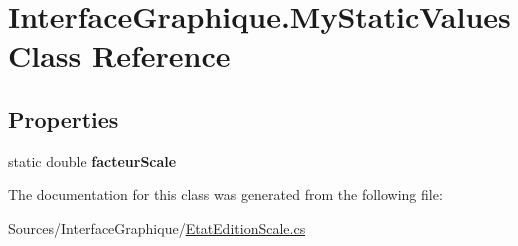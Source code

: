 \hypertarget{class_interface_graphique_1_1_my_static_values}{}\section{Interface\+Graphique.\+My\+Static\+Values Class Reference}
\label{class_interface_graphique_1_1_my_static_values}
\subsection*{Properties}
\begin{DoxyCompactItemize}
\item 
static double {\bfseries facteur\+Scale}
\end{DoxyCompactItemize}


The documentation for this class was generated from the following file\+:\begin{DoxyCompactItemize}
\item 
Sources/\+Interface\+Graphique/\hyperlink{_etat_edition_scale_8cs}{Etat\+Edition\+Scale.\+cs}\end{DoxyCompactItemize}
